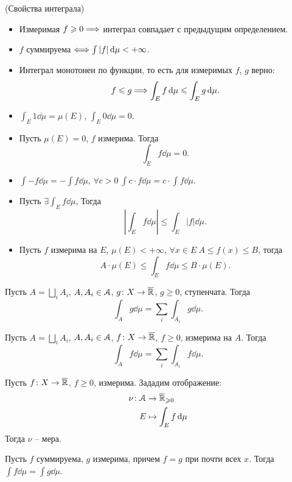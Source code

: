 \begin{theorem}(Свойства интеграла)
	\enewline

	\begin{itemize}
		\item Измеримая $f \geqslant 0 \Longrightarrow$ интеграл совпадает с предыдущим определением.
		\item $f$ суммируема $\Longleftrightarrow \int{|f| \,\mathrm{d}\mu} < +\infty$. 
        \item Интеграл монотонен по функции, то есть для измеримых $f$, $g$ верно:
\[
    f \leqslant g \Longrightarrow \int_{E}{f \,\mathrm{d}\mu} \leqslant \int_{E}{g \,\mathrm{d}\mu}
.\] 
        \item $\displaystyle \int_E{1 \dd\mu} = \mu(E)$, $\displaystyle \int_E{0 \dd\mu} = 0$.
        \item Пусть $\mu(E) = 0$, $f$ измерима. Тогда
\[
    \int_E{f \dd\mu} = 0
.\] 
        \item $\displaystyle \int{-f \dd\mu} = -\int{f \dd\mu}$, $\displaystyle 
               \forall c > 0~ \int{c \cdot f \dd\mu} = c \cdot \int{f \dd\mu}$.
        \item Пусть $\displaystyle \exists \int_E{f \dd\mu}$, Тогда
\[
    \left|{\int_E{f \dd\mu}}\right| \leqslant {\int_E{|f| \dd\mu}}
.\] 
        \item Пусть $f$ измерима на $E$, $\mu(E) < +\infty$, 
            $\forall x \in E~ A \leqslant f(x) \leqslant B$,
            тогда
\[
    A \cdot \mu(E) \leqslant \int_E{f \dd\mu} \leqslant B \cdot \mu(E)
.\] 
	\end{itemize}
\end{theorem}

\begin{lemma}
    Пусть $A = \bigsqcup_i{A_i}$, $A, A_i \in \mathcal{A}$, $g \colon X \to \overline{\mathbb{R}}$, $g \geqslant 0$, 
    ступенчата. Тогда
\[
    \int_A{g \dd\mu} = \sum_i{\int_{A_i}{g \dd\mu}}
.\] 
\end{lemma}

\begin{theorem}
    Пусть $A = \bigsqcup_i{A_i}$, $A, A_i \in \mathcal{A}$, $f \colon X \to \overline{\mathbb{R}}$, $f \geqslant 0$,
    измерима на $A$. Тогда
\[
    \int_A{f \dd\mu} = \sum_i{\int_{A_i}{f \dd\mu}}
.\] 
\end{theorem}

\begin{corollary}
    Пусть $f \colon X \to \overline{\mathbb{R}}$, $f \geqslant 0$, измерима. Зададим отображение:
    \begin{align*}
        \nu \colon &\mathcal{A} \to \overline{\mathbb{R}}_{\geqslant 0} \\ 
                   &E \mapsto \int_E{f \,\mathrm{d}\mu}
    \end{align*}
    Тогда $\nu$ -- мера.
\end{corollary}

\begin{lemma}
    Пусть $f$ суммируема, $g$ измерима, причем $f = g$ при почти всех $x$. Тогда
    $\displaystyle \int{f \dd\mu} = \int{g \dd\mu}$.
\end{lemma}
